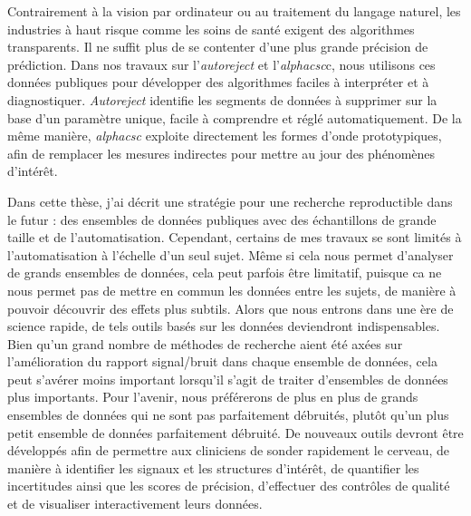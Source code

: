 Contrairement à la vision par ordinateur ou au traitement du langage naturel, les industries à haut risque comme les soins de santé exigent des algorithmes transparents. Il ne suffit plus de se contenter d'une plus grande précision de prédiction. Dans nos travaux sur l'\emph{autoreject} et l'\emph{alphacsc}c, nous utilisons ces données publiques pour développer des algorithmes faciles à interpréter et à diagnostiquer. \emph{Autoreject} identifie les segments de données à supprimer sur la base d'un paramètre unique, facile à comprendre et réglé automatiquement. De la même manière, \emph{alphacsc} exploite directement les formes d'onde prototypiques, afin de remplacer les mesures indirectes pour mettre au jour des phénomènes d'intérêt.

Dans cette thèse, j'ai décrit une stratégie pour une recherche reproductible dans le futur : des ensembles de données publiques avec des échantillons de grande taille et de l'automatisation. Cependant, certains de mes travaux se sont limités à l'automatisation à l'échelle d'un seul sujet. Même si cela nous permet d'analyser de grands ensembles de données, cela peut parfois être limitatif, puisque ca ne nous permet pas de mettre en commun les données entre les sujets, de manière à pouvoir découvrir des effets plus subtils. Alors que nous entrons dans une ère de science rapide, de tels outils basés sur les données deviendront indispensables. Bien qu'un grand nombre de méthodes de recherche aient été axées sur l'amélioration du rapport signal/bruit dans chaque ensemble de données, cela peut s'avérer moins important lorsqu'il s'agit de traiter d'ensembles de données plus importants. Pour l'avenir, nous préférerons de plus en plus de grands ensembles de données qui ne sont pas parfaitement débruités, plutôt qu'un plus petit ensemble de données parfaitement débruité. De nouveaux outils devront être développés afin de permettre aux cliniciens de sonder rapidement le cerveau, de manière à identifier les signaux et les structures d'intérêt, de quantifier les incertitudes ainsi que les scores de précision, d'effectuer des contrôles de qualité et de visualiser interactivement leurs données.


